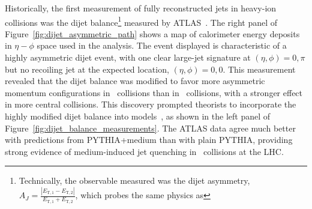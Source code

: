Historically, the first measurement of fully reconstructed jets in heavy-ion collisions was the dijet balance\footnote{Technically, the observable measured was the dijet asymmetry, $A_J = \frac{|E_{\mathrm{T,1}}-E_{\mathrm{T,2}}|}{E_{\mathrm{T,1}}+E_{\mathrm{T,2}}}$, which probes the same physics as \XJ} measured by ATLAS~\cite{HION-2010-02}.
The right panel of Figure~\ref{fig:dijet_asymmetric_path} shows a map of calorimeter energy deposits in $\eta-\phi$ space used in the analysis.
The event displayed is characteristic of a highly asymmetric dijet event, with one clear large-jet signature at $(\eta, \phi ) = 0,\pi$ but no recoiling jet at the expected location, $(\eta, \phi ) = 0,0$.
This measurement revealed that the dijet balance was modified to favor more asymmetric momentum configurations in \PbxPb\ collisions than in \pxp\ collisions, with a stronger effect in more central collisions.
This discovery prompted theorists to incorporate the highly modified dijet balance into models~\cite{QGP:Dijet2010Theory1,QGP:Dijet2010Theory2}, as shown in the left panel of Figure~\ref{fig:dijet_balance_measurements}.
The ATLAS data agree much better with predictions from \textsc{PYTHIA}+medium than with plain \textsc{PYTHIA}, providing strong evidence of medium-induced jet quenching in \PbxPb\ collisions at the LHC.
